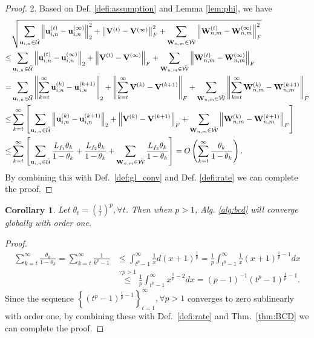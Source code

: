 \documentclass{article}
\newtheorem{cor}{Corollary}
\begin{document}
\begin{proof}
2. Based on Def. \ref{defi:assumption} and Lemma \ref{lem:phi}, we have
\begin{align}
&\sqrt{\sum_{\mathbf{u}_{i,n}\in\tilde{\mathcal{U}}}\left\|\mathbf{u}_{i,n}^{(t)}-\mathbf{u}_{i,n}^{(\infty)}\right\|_2^2 + \left\|\mathbf{V}^{(t)}-\mathbf{V}^{(\infty)}\right\|_F^2 + \sum_{\mathbf{W}_{n,m}\in\tilde{\mathcal{W}}}\left\|\mathbf{W}_{n,m}^{(t)}-\mathbf{W}_{n,m}^{(\infty)}\right\|_F^2} \nonumber \\
\leq & \sum_{\mathbf{u}_{i,n}\in\tilde{\mathcal{U}}}\left\|\mathbf{u}_{i,n}^{(t)}-\mathbf{u}_{i,n}^{(\infty)}\right\|_2 + \left\|\mathbf{V}^{(t)}-\mathbf{V}^{(\infty)}\right\|_F + \sum_{\mathbf{W}_{n,m}\in\tilde{\mathcal{W}}}\left\|\mathbf{W}_{n,m}^{(t)}-\mathbf{W}_{n,m}^{(\infty)}\right\|_F \nonumber \\
= & \hspace{0mm}\sum_{\mathbf{u}_{i,n}\in\tilde{\mathcal{U}}}\left\|\sum_{k=t}^{\infty}\mathbf{u}_{i,n}^{(k)}-\mathbf{u}_{i,n}^{(k+1)}\right\|_2 + \left\|\sum_{k=t}^{\infty}\mathbf{V}^{(k)}-\mathbf{V}^{(k+1)}\right\|_F + \hspace{0mm} \sum_{\mathbf{W}_{n,m}\in\tilde{\mathcal{W}}}\left\|\sum_{k=t}^{\infty}\mathbf{W}_{n,m}^{(k)}-\mathbf{W}_{n,m}^{(k+1)}\right\|_F \nonumber \\
\leq & \sum_{k=t}^{\infty}\left[\sum_{\mathbf{u}_{i,n}\in\tilde{\mathcal{U}}}\left\|\mathbf{u}_{i,n}^{(k)}-\mathbf{u}_{i,n}^{(k+1)}\right\|_2 + \left\|\mathbf{V}^{(k)}-\mathbf{V}^{(k+1)}\right\|_F + \sum_{\mathbf{W}_{n,m}\in\tilde{\mathcal{W}}}\left\|\mathbf{W}_{n,m}^{(k)}-\mathbf{W}_{n,m}^{(k+1)}\right\|_F\right] \nonumber \\
\leq & \sum_{k=t}^{\infty}\left[\sum_{\mathbf{u}_{i,n}\in\tilde{\mathcal{U}}} \frac{L_{f_1}\theta_k}{1-\theta_k} + \frac{L_{f_2}\theta_k}{1-\theta_k} + \sum_{\mathbf{W}_{n,m}\in\tilde{\mathcal{W}}}\frac{L_{f_3}\theta_k}{1-\theta_k}\right] = O\left(\sum_{k=t}^{\infty}\frac{\theta_k}{1-\theta_k}\right). \nonumber
\end{align}
By combining this with Def.~\ref{def:gl_conv} and Def. \ref{defi:rate} we can complete the proof.
\end{proof}

\begin{cor}
Let $\theta_t=\left(\frac{1}{t}\right)^p, \forall t$. Then when $p>1$, Alg. \ref{alg:bcd} will converge globally with order one.
\end{cor}
\begin{proof}
\begin{align}
\sum_{k=t}^{\infty}\frac{\theta_k}{1-\theta_k} = \sum_{k=t}^{\infty}\frac{1}{k^p-1} & \leq \int_{t^p-1}^{\infty}\frac{1}{x}d(x+1)^{\frac{1}{p}}=\frac{1}{p}\int_{t^p-1}^{\infty}\frac{1}{x}(x+1)^{\frac{1}{p}-1}dx \nonumber \\
& \stackrel{\because p>1}{\leq}\frac{1}{p}\int_{t^p-1}^{\infty}x^{\frac{1}{p}-2}dx = (p-1)^{-1}(t^p-1)^{\frac{1}{p}-1}.
\end{align}
Since the sequence $\left\{(t^p-1)^{\frac{1}{p}-1}\right\}_{t=1}^{\infty}, \forall p>1$ converges to zero sublinearly with order one, by combining these with Def.~\ref{defi:rate} and Thm.~\ref{thm:BCD} we can complete the proof.
\end{proof}
\end{document}
